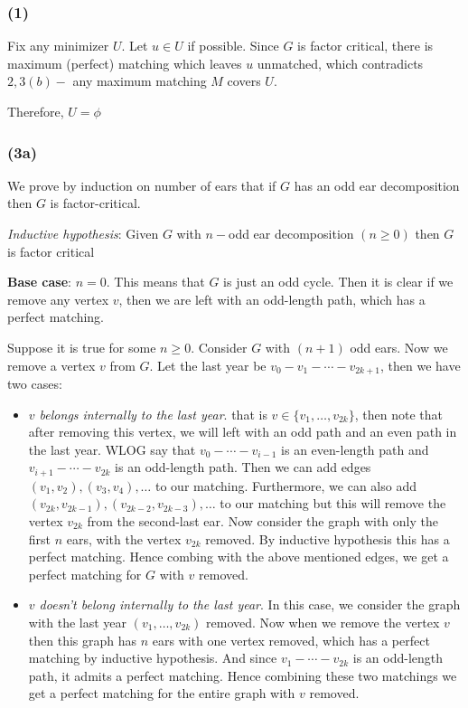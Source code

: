 \documentclass[12pt]{article}
\begin{document}
\subsubsection*{(1)}

Fix any minimizer $U$. Let $u \in U$ if possible. Since $G$ is factor critical, there is maximum (perfect) matching which leaves $u$ unmatched, which contradicts $2,3(b) -$  any maximum matching $M$ covers $U$.

Therefore, $U = \phi$

\subsubsection*{(3a)}

We prove by induction on number of ears that if $G$ has an odd ear decomposition then $G$ is factor-critical.

\textsl{Inductive hypothesis}: Given $G$ with $n-$odd ear decomposition $(n \geq 0)$ then $G$ is factor critical

\textbf{Base case}: $n=0$. This means that $G$ is just an odd cycle. Then it is clear if we remove any vertex $v$, then we are left with an odd-length path, which has a perfect matching.

Suppose it is true for some $n \geq 0$. Consider $G$ with $(n+1)$ odd ears. Now we remove a vertex $v$ from $G$. Let the last year be $v_0 - v_1 - \cdots - v_{2k+1}$, then we have two cases:
\begin{itemize}
  \item \textsl{$v$ belongs internally to the last year}. that is $v \in \{v_1, \ldots, v_{2k}\}$, then note that after removing this vertex, we will left with an odd path and an even path in the last year. WLOG say that $v_0 - \cdots - v_{i-1}$ is an even-length path and $v_{i+1} - \cdots - v_{2k}$ is an odd-length path. Then we can add edges $(v_1,v_2), (v_3,v_4), \ldots$ to our matching. Furthermore, we can also add $(v_{2k}, v_{2k-1}), (v_{2k-2}, v_{2k-3}), \ldots$ to our matching but this will remove the vertex $v_{2k}$ from the second-last ear. Now consider the graph with only the first $n$ ears, with the vertex $v_{2k}$ removed. By inductive hypothesis this has a perfect matching. Hence combing with the above mentioned edges, we get a perfect matching for $G$ with $v$ removed.
  
  \item \textsl{$v$ doesn't belong internally to the last year}. In this case, we consider the graph with the last year $(v_1, \ldots, v_{2k})$ removed. Now when we remove the vertex $v$ then this graph has $n$ ears with one vertex removed, which has a perfect matching by inductive hypothesis. And since $v_1 - \cdots - v_{2k}$ is an odd-length path, it admits a perfect matching. Hence combining these two matchings we get a perfect matching for the entire graph with $v$ removed.
\end{itemize}
\end{document}
